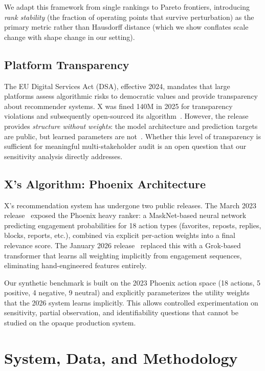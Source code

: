 \documentclass[11pt,letterpaper]{article}
\begin{document}
We adapt this framework from single rankings to Pareto frontiers,
introducing \emph{rank stability} (the fraction of operating points
that survive perturbation) as the primary metric rather than
Hausdorff distance (which we show conflates scale change with shape
change in our setting).

\subsection{Platform Transparency}

The EU Digital Services Act (DSA), effective 2024, mandates that
large platforms assess algorithmic risks to democratic values and
provide transparency about recommender systems. X was fined
\texteuro{}140M in 2025 for transparency violations and subsequently
open-sourced its algorithm~\cite{xalgorithm2026}. However, the
release provides \emph{structure without weights}: the model
architecture and prediction targets are public, but learned
parameters are not~\cite{shaped2023secrets}. Whether this level of
transparency is sufficient for meaningful multi-stakeholder audit is
an open question that our sensitivity analysis directly addresses.

\subsection{X's Algorithm: Phoenix Architecture}

X's recommendation system has undergone two public releases. The
March 2023 release~\cite{xalgorithm2023} exposed the Phoenix heavy
ranker: a MaskNet-based neural network predicting engagement
probabilities for 18 action types (favorites, reposts, replies,
blocks, reports, etc.), combined via explicit per-action weights into
a final relevance score. The January 2026
release~\cite{xalgorithm2026} replaced this with a Grok-based
transformer that learns all weighting implicitly from engagement
sequences, eliminating hand-engineered features entirely.

Our synthetic benchmark is built on the 2023 Phoenix action space (18
actions, 5 positive, 4 negative, 9 neutral) and explicitly
parameterizes the utility weights that the 2026 system learns
implicitly. This allows controlled experimentation on sensitivity,
partial observation, and identifiability questions that cannot be
studied on the opaque production system.

\section{System, Data, and Methodology}
\label{sec:system}
\end{document}

